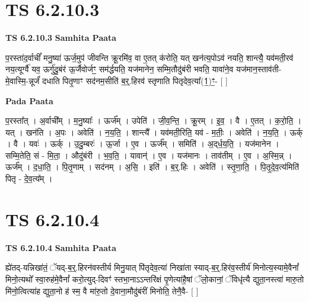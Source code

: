 \documentclass[17pt]{extarticle}
\begin{document}

\section{ TS 6.2.10.3 }

\textbf{TS 6.2.10.3 } \newline
\textbf{Samhita Paata} \newline

प॒रस्ता॑द॒र्वाचीं᳚ मनु॒ष्या॑ ऊर्ज॒मुप॑ जीवन्ति क्रू॒रमि॑व॒ वा ए॒तत् क॑रोति॒ यत् खन॑त्य॒पोऽव॑ नयति॒ शान्त्यै॒ यव॑मती॒रव॑ नय॒त्यूर्ग्वै॑ यव॒ ऊर्गु॑दु॒बंर॑ ऊ॒र्जैवोर्जꣳ॒॒ सम॑र्द्धयति॒ यज॑मानेन॒ सम्मि॒तौदु॑बंरी भवति॒ यावा॑ने॒व यज॑मान॒स्ताव॑ती-मे॒वास्मि॒-न्नूर्जं॑ दधाति पितृ॒णाꣳ सद॑नम॒सीति॑ ब॒र्॒.हिरव॑ स्तृणाति पितृदेव॒त्या᳚(1॒)ꣳ॒- [  ] \newline

\textbf{Pada Paata} \newline

प॒रस्ता᳚त् । अ॒र्वाची᳚म् । म॒नु॒ष्याः᳚ । ऊर्ज᳚म् । उपेति॑ । जी॒व॒न्ति॒ । क्रू॒रम् । इ॒व॒ । वै । ए॒तत् । क॒रो॒ति॒ । यत् । खन॑ति । अ॒पः । अवेति॑ । न॒य॒ति॒ । शान्त्यै᳚ । यव॑मती॒रिति॒ यव॑ - म॒तीः॒ । अवेति॑ । न॒य॒ति॒ । ऊर्क् । वै । यवः॑ । ऊर्क् । उ॒दु॒म्बरः॑ । ऊ॒र्जा । ए॒व । ऊर्ज᳚म् । समिति॑ । अ॒द्‌र्ध॒य॒ति॒ । यज॑मानेन । सम्मि॒तेति॒ सं - मि॒ता॒ । औदु॑बंरी । भ॒व॒ति॒ । यावान्॑ । ए॒व । यज॑मानः । ताव॑तीम् । ए॒व । अ॒स्मि॒न्न् । ऊर्ज᳚म् । द॒धा॒ति॒ । पि॒तृ॒णाम् । सद॑नम् । अ॒सि॒ । इति॑ । ब॒र्॒.हिः । अवेति॑ । स्तृ॒णा॒ति॒ । पि॒तृ॒दे॒व॒त्य॑मिति॑ पितृ - दे॒व॒त्य᳚म् ।  \newline





\section{ TS 6.2.10.4 }

\textbf{TS 6.2.10.4 } \newline
\textbf{Samhita Paata} \newline

ह्ये॑तद्-यन्निखा॑तं॒ ॅयद्-ब॒र्॒.हिरन॑वस्तीर्य मिनु॒यात् पि॑तृदेव॒त्या॑ निखा॑ता स्याद्-ब॒र्॒.हिर॑व॒स्तीर्य॑ मिनोत्य॒स्यामे॒वैनां᳚ मिनो॒त्यथो᳚ स्वा॒रुह॑मे॒वैनां᳚ करो॒त्युद्-दिवꣳ॑ स्तभा॒नाऽऽन्तरि॑क्षं पृ॒णेत्या॑है॒षां ॅलो॒कानां॒ ॅविधृ॑त्यै द्युता॒नस्त्वा॑ मारु॒तो मि॑नो॒त्वित्या॑ह द्युता॒नो ह॑ स्म॒ वै मा॑रु॒तो दे॒वाना॒मौदु॑बंरीं मिनोति॒ तेनै॒वै- [  ] \newline
\end{document}

